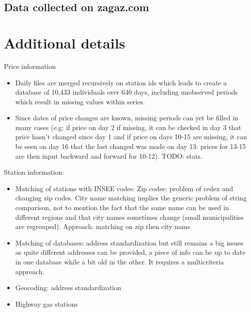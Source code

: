 \documentclass[11pt]{article}
\begin{document}
\subsection{Data collected on zagaz.com}

\clearpage

\appendix

\section{Additional details}

Price information
\begin{itemize}
\item Daily files are merged recursively on station ids which leads to create a database of 10,433 individuals over 640 days, including unobserved periods which result in missing values within series.
\item Since dates of price changes are known, missing periods can yet be filled in many cases (e.g: if price on day 2 if missing, it can be checked in day 3 that price hasn't changed since day 1 and if price on days 10-15 are missing, it can be seen on day 16 that the last changed was made on day 13: prices for 13-15 are then input backward and forward for 10-12). TODO: stats.
\end{itemize}

Station information:
\begin{itemize}
\item Matching of stations with INSEE codes: Zip codes: problem of cedex and changing zip codes. City name matching implies the generic problem of string comparison, not to mention the fact that the same name can be used in different regions and that city names sometimes change (small municipalities are regrouped). Approach: matching on zip then city name
\item Matching of databases: address standardization but still remains a big issues as quite different addresses can be provided, a piece of info can be up to date in one database while a bit old in the other. It requires a multicriteria approach.
\item Geocoding: address standardization
\item Highway gas stations
\end{itemize}
\end{document}
